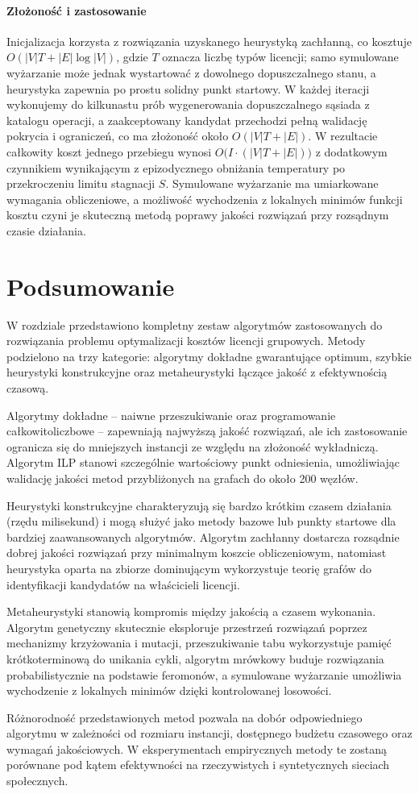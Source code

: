 \paragraph{Złożoność i zastosowanie}
Inicjalizacja korzysta z rozwiązania uzyskanego heurystyką zachłanną, co kosztuje $O(|V|T + |E|\log |V|)$, gdzie $T$ oznacza liczbę typów licencji; samo symulowane wyżarzanie może jednak wystartować z dowolnego dopuszczalnego stanu, a heurystyka zapewnia po prostu solidny punkt startowy. W każdej iteracji wykonujemy do kilkunastu prób wygenerowania dopuszczalnego sąsiada z katalogu operacji, a zaakceptowany kandydat przechodzi pełną walidację pokrycia i ograniczeń, co ma złożoność około $O(|V|T + |E|)$. W rezultacie całkowity koszt jednego przebiegu wynosi $O\bigl(I \cdot (|V|T + |E|)\bigr)$ z dodatkowym czynnikiem wynikającym z epizodycznego obniżania temperatury po przekroczeniu limitu stagnacji $S$. Symulowane wyżarzanie ma umiarkowane wymagania obliczeniowe, a możliwość wychodzenia z lokalnych minimów funkcji kosztu czyni je skuteczną metodą poprawy jakości rozwiązań przy rozsądnym czasie działania.

\section{Podsumowanie}

W rozdziale przedstawiono kompletny zestaw algorytmów zastosowanych do rozwiązania problemu optymalizacji kosztów licencji grupowych. Metody podzielono na trzy kategorie: algorytmy dokładne gwarantujące optimum, szybkie heurystyki konstrukcyjne oraz metaheurystyki łączące jakość z efektywnością czasową.

Algorytmy dokładne -- naiwne przeszukiwanie oraz programowanie całkowitoliczbowe -- zapewniają najwyższą jakość rozwiązań, ale ich zastosowanie ogranicza się do mniejszych instancji ze względu na złożoność wykładniczą. Algorytm ILP stanowi szczególnie wartościowy punkt odniesienia, umożliwiając walidację jakości metod przybliżonych na grafach do około 200 węzłów.

Heurystyki konstrukcyjne charakteryzują się bardzo krótkim czasem działania (rzędu milisekund) i mogą służyć jako metody bazowe lub punkty startowe dla bardziej zaawansowanych algorytmów. Algorytm zachłanny dostarcza rozsądnie dobrej jakości rozwiązań przy minimalnym koszcie obliczeniowym, natomiast heurystyka oparta na zbiorze dominującym wykorzystuje teorię grafów do identyfikacji kandydatów na właścicieli licencji.

Metaheurystyki stanowią kompromis między jakością a czasem wykonania. Algorytm genetyczny skutecznie eksploruje przestrzeń rozwiązań poprzez mechanizmy krzyżowania i mutacji, przeszukiwanie tabu wykorzystuje pamięć krótkoterminową do unikania cykli, algorytm mrówkowy buduje rozwiązania probabilistycznie na podstawie feromonów, a symulowane wyżarzanie umożliwia wychodzenie z lokalnych minimów dzięki kontrolowanej losowości.

Różnorodność przedstawionych metod pozwala na dobór odpowiedniego algorytmu w zależności od rozmiaru instancji, dostępnego budżetu czasowego oraz wymagań jakościowych. W eksperymentach empirycznych metody te zostaną porównane pod kątem efektywności na rzeczywistych i syntetycznych sieciach społecznych.
